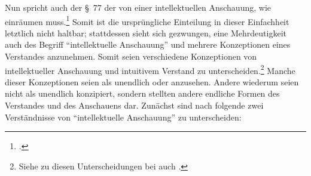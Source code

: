 Nun spricht auch der \S~77 der  von einer
intellektuellen Anschauung, wie
einräumen
muss.\footcite[Vgl.][178]{Foerster:DieBedeutungvonSS7677deremphKritikderUrteilskraftfuerdieEntwicklungdernachkantischenPhilosophieTeil12002}
Somit ist die ursprüngliche Einteilung in dieser Einfachheit letztlich nicht
haltbar; stattdessen sieht sich  gezwungen, eine
Mehrdeutigkeit auch des Begriff \enquote{intellektuelle Anschauung} und mehrere
Konzeptionen eines  Verstandes anzunehmen.
Somit seien verschiedene Konzeptionen von intellektueller Anschauung und intuitivem Verstand
zu unterscheiden.\footnote{Siehe zu diesen Unterscheidungen bei
auch \cite[][151]{Quarfood:DiscursivityandTranscendentalIdealism2012}.} Manche
dieser Konzeptionen seien als unendlich oder  anzusehen.
Andere wiederum seien nicht als unendlich konzipiert, sondern stellten andere
endliche Formen des Verstandes und des Anschauens dar. Zunächst sind nach
folgende zwei Verständnisse von \enquote{intellektuelle Anschauung} zu
unterscheiden:
